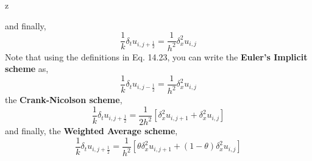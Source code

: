 z\documentclass[a4paper,12pt,twoside]{book}
\begin{document}
and finally,
\begin{equation}
    \frac{1}{k} \delta_t u_{i,j+\frac{1}{2}} = \frac{1}{h^2}\delta_x^2u_{i,j}
\end{equation}
Note that using the definitions in Eq. 14.23, you can write the \textbf{Euler's Implicit scheme} as,
\begin{equation}
    \frac{1}{k} \delta_t u_{i,j-\frac{1}{2}} = \frac{1}{h^2} \delta_x^2 u_{i,j}
\end{equation}
the \textbf{Crank-Nicolson scheme},
\begin{equation}
    \frac{1}{k}\delta_t u_{i,j+\frac{1}{2}} = \frac{1}{2h^2} \left[ \delta_x^2u_{i,j+1} + \delta_x^2 u_{i,j}\right]
\end{equation}
and finally, the\textbf{ Weighted Average scheme},
\begin{equation}
    \frac{1}{k}\delta_t u_{i,j+\frac{1}{2}} = \frac{1}{h^2}\left[ \theta \delta_x^2 u_{i,j+1} + (1-\theta) \delta_x^2 u_{i,j} \right]
\end{equation}
\end{document}
